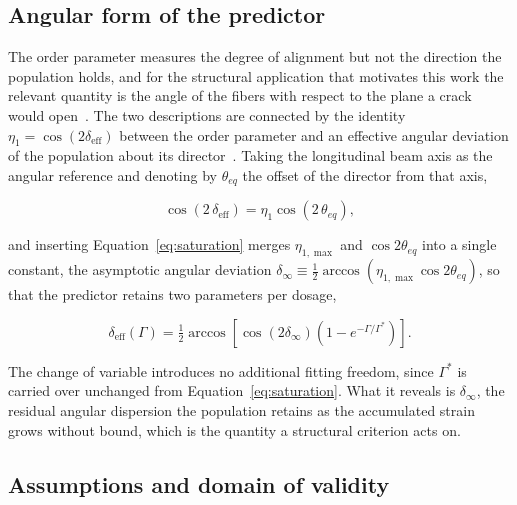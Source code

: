 \documentclass[%
  aip,
  pof,          %
  reprint,      %
  floatfix
]{revtex4-2}
\begin{document}
\subsection{Angular form of the predictor}
\label{sec:governing_angle}

The order parameter measures the degree of alignment but not the direction the population holds, and for the structural application that motivates this work the relevant quantity is the angle of the fibers with respect to the plane a crack would open~\cite{kang2011tensile,abrishambaf2017influence}. The two descriptions are connected by the identity $\eta_1 = \cos(2\delta_{\mathrm{eff}})$ between the order parameter and an effective angular deviation of the population about its director~\cite{mardia2000directional}. Taking the longitudinal beam axis as the angular reference and denoting by $\theta_{eq}$ the offset of the director from that axis,

\begin{equation}
    \cos\!\left(2\,\delta_{\mathrm{eff}}\right) = \eta_1 \cos\!\left(2\,\theta_{eq}\right),
    \label{eq:angle_identity}
\end{equation}

and inserting Equation~\eqref{eq:saturation} merges $\eta_{1,\max}$ and $\cos 2\theta_{eq}$ into a single constant, the asymptotic angular deviation $\delta_\infty \equiv \tfrac{1}{2}\arccos\!\left(\eta_{1,\max}\cos 2\theta_{eq}\right)$, so that the predictor retains two parameters per dosage,

\begin{equation}
    \delta_{\mathrm{eff}}(\Gamma) = \tfrac{1}{2}\arccos\!\left[\cos(2\delta_\infty)\left(1 - e^{-\Gamma/\Gamma^*}\right)\right].
    \label{eq:angle_predictor}
\end{equation}

The change of variable introduces no additional fitting freedom, since $\Gamma^*$ is carried over unchanged from Equation~\eqref{eq:saturation}. What it reveals is $\delta_\infty$, the residual angular dispersion the population retains as the accumulated strain grows without bound, which is the quantity a structural criterion acts on.

\subsection{Assumptions and domain of validity}
\label{sec:governing_assumptions}
\end{document}
